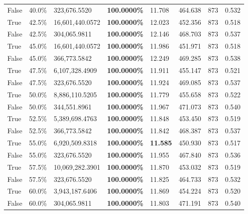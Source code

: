 \begin{table}[H]
{\begin{tabular}{lllrllll}
\cline{1-8}
False & 40.0\% & 323,676.5520 & \bfseries \color{red} 100.0000\% & 11.708 & 464.638 & 873 & 0.532 \\
\cline{1-8}
True & 42.5\% & 16,601,440.0572 & \bfseries \color{red} 100.0000\% & 12.023 & 452.356 & 873 & 0.518 \\
\cline{1-8}
False & 42.5\% & 304,065.9811 & \bfseries \color{red} 100.0000\% & 12.146 & 468.703 & 873 & 0.537 \\
\cline{1-8}
True & 45.0\% & 16,601,440.0572 & \bfseries \color{red} 100.0000\% & 11.986 & 451.971 & 873 & 0.518 \\
\cline{1-8}
False & 45.0\% & 366,773.5842 & \bfseries \color{red} 100.0000\% & 12.249 & 469.285 & 873 & 0.538 \\
\cline{1-8}
True & 47.5\% & 6,107,328.4909 & \bfseries \color{red} 100.0000\% & 11.911 & 455.147 & 873 & 0.521 \\
\cline{1-8}
False & 47.5\% & 323,676.5520 & \bfseries \color{red} 100.0000\% & 11.924 & 469.085 & 873 & 0.537 \\
\cline{1-8}
True & 50.0\% & 8,886,110.5205 & \bfseries \color{red} 100.0000\% & 11.779 & 455.658 & 873 & 0.522 \\
\cline{1-8}
False & 50.0\% & 344,551.8961 & \bfseries \color{red} 100.0000\% & 11.967 & 471.073 & 873 & 0.540 \\
\cline{1-8}
True & 52.5\% & 5,389,698.4763 & \bfseries \color{red} 100.0000\% & 11.848 & 453.450 & 873 & 0.519 \\
\cline{1-8}
False & 52.5\% & 366,773.5842 & \bfseries \color{red} 100.0000\% & 11.842 & 468.387 & 873 & 0.537 \\
\cline{1-8}
True & 55.0\% & 6,920,509.8318 & \bfseries \color{red} 100.0000\% & \bfseries \color{red} 11.585 & 450.930 & 873 & 0.517 \\
\cline{1-8}
False & 55.0\% & 323,676.5520 & \bfseries \color{red} 100.0000\% & 11.955 & 467.840 & 873 & 0.536 \\
\cline{1-8}
True & 57.5\% & 10,069,282.3901 & \bfseries \color{red} 100.0000\% & 11.870 & 453.032 & 873 & 0.519 \\
\cline{1-8}
False & 57.5\% & 323,676.5520 & \bfseries \color{red} 100.0000\% & 11.825 & 464.733 & 873 & 0.532 \\
\cline{1-8}
True & 60.0\% & 3,943,187.6406 & \bfseries \color{red} 100.0000\% & 11.869 & 454.224 & 873 & 0.520 \\
\cline{1-8}
False & 60.0\% & 304,065.9811 & \bfseries \color{red} 100.0000\% & 11.803 & 471.191 & 873 & 0.540 \\

\end{tabular}}
\end{table}
